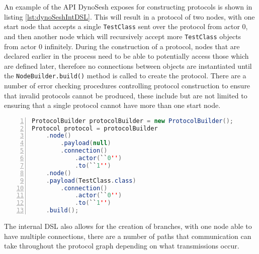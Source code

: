 \documentclass{article}
\begin{document}
	An example of the API DynoSesh exposes for constructing protocols is shown in listing \ref{lst:dynoSeshIntDSL}. This will result in a protocol of two nodes, with one start node that accepts a single \texttt{TestClass} sent over the protocol from actor 0, and then another node which will recursively accept more \texttt{TestClass} objects from actor 0 infinitely. During the construction of a protocol, nodes that are declared earlier in the process need to be able to potentially access those which are defined later, therefore no connections between objects are instantiated until the \texttt{NodeBuilder.build()} method is called to create the protocol. There are a number of error checking procedures controlling protocol construction to ensure that invalid protocols cannot be produced, these include but are not limited to ensuring that a single protocol cannot have more than one start node.
	\begin{lstlisting}[label={lst:dynoSeshIntDSL}, language=java, frame=single, numbers=left, caption=Construction of a DynoSesh graph using the internal DSL]
ProtocolBuilder protocolBuilder = new ProtocolBuilder();
Protocol protocol = protocolBuilder
	.node()
		.payload(null)
		.connection()
			.actor(``0'')
			.to(``1'')
	.node()
	.payload(TestClass.class)
		.connection()
			.actor(``0'')
			.to(``1'')
	.build();
	\end{lstlisting}
	The internal DSL also allows for the creation of branches, with one node able to have multiple connections, there are a number of paths that communication can take throughout the protocol graph depending on what transmissions occur.
	\pagebreak
	\printbibliography
\end{document}
